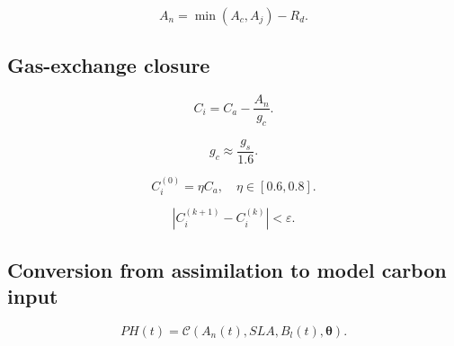 \documentclass[a4paper,fleqn]{cas-dc}
\begin{document}
\begin{equation}
A_n = \min(A_c, A_j) - R_d .
\end{equation}


\subsection{Gas-exchange closure}

\begin{equation}
C_i = C_a - \frac{A_n}{g_c}.
\end{equation}

\begin{equation}
g_c \approx \frac{g_s}{1.6}.
\end{equation}


\begin{equation}
C_i^{(0)} = \eta C_a, \quad \eta \in [0.6,0.8].
\end{equation}

\begin{equation}
\left| C_i^{(k+1)} - C_i^{(k)} \right| < \varepsilon .
\end{equation}


\subsection{Conversion from assimilation to model carbon input}

\begin{equation}
PH(t) = \mathcal{C}\left(A_n(t), SLA, B_l(t), \boldsymbol{\theta}\right).
\end{equation}

\end{document}
